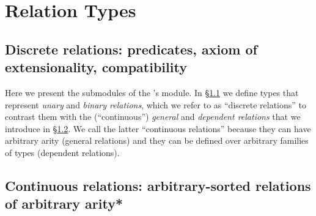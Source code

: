 \section{Relation Types}\label{sec:relat-quot-types}
\subsection{Discrete relations: predicates, axiom of extensionality, compatibility}\label{sec:discrete-relations}
Here we present the submodules of the \agdaualib's  module. In \S\ref{sec:discrete-relations} we define types that represent \emph{unary} and \emph{binary relations}, which we refer to as ``discrete relations'' to contrast them with the (``continuous'') \emph{general} and \emph{dependent relations} that we introduce in \S\ref{sec:continuous-relations}. We call the latter ``continuous relations'' because they can have arbitrary arity (general relations) and they can be defined over arbitrary families of types (dependent relations).



\subsection{Continuous relations: arbitrary-sorted relations of arbitrary arity*\protect\footnotemark}\label{sec:continuous-relations}


